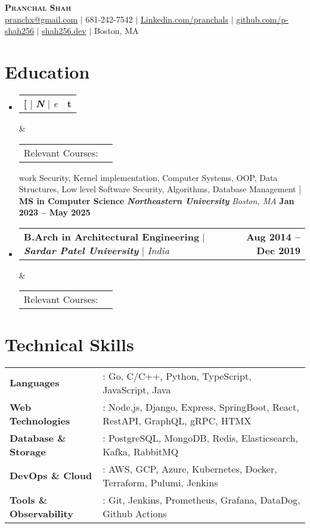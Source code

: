 \documentclass[letterpaper,11pt]{article}
\makeatletter
\newcommand{\preSecSpace}{-10pt}
\newcommand{\postItemSpace}{-10pt}
\newcommand{\preItemSpace}{-10pt}
\newcommand{\preSecVSpace}{\vspace{\preSecSpace}}
\newcommand{\postItemVSpace}{\vspace{\postItemSpace}}
\newcommand{\eduItem}[5][]{
    \item
    \begin{tabular*}{\textwidth}
        {p{5.7in}@{\extracolsep{\fill}}r}
        \textbf{#2} $|$ \textbf{\textit{#3}} $|$ \textit{#4} & \textbf{#5} \\
    \end{tabular*}
        \ifx#1&%
        \else
            \begin{tabular*}{\textwidth}
                {l@{}p{4.5in}}
                \small{Relevant Courses: } & {\small #1} \\
            \end{tabular*}
        \fi
    \postItemVSpace
}
\newcommand{\sectionStart}{
    \begin{itemize}[
        leftmargin=0pt,
        label={},
        topsep=\preItemSpace,    %
        itemsep=2pt,   %
    ]
}
\newcommand{\sectionEnd}{
    \end{itemize}
}
\makeatother
\begin{document}
\begin{center}
    \textbf{\Huge \scshape Pranchal Shah} \\
    \vspace{1pt}
    \href{mailto:pranchx@gmail.com}{\small\underline{pranchx@gmail.com}} $|$
    \small 681-242-7542 $|$
    \href{https://linkedin.com/in/pranchals}{\underline{Linkedin.com/pranchals}} $|$
    \href{https://github.com/p-shah256}{\underline{github.com/p-shah256}} $|$
    \href{https://shah256.dev}{\underline{shah256.dev}} $|$
    \small Boston, MA
    \vspace{1pt}
\end{center}

\section{Education}
\sectionStart
    \eduItem
        [Network Security, Kernel implementation, Computer Systems, OOP, Data Structures, Low level Software Security, Algorithms, Database Management ]
        {\textbf {MS in Computer Science}}
        {\textbf{\textit{Northeastern University}}}
        {\textit{Boston, MA}}
        {\textbf{Jan 2023 -- May 2025}}
    \eduItem
        {\textbf{B.Arch in Architectural Engineering}}
        {\textbf{\textit{Sardar Patel University}}}
        {\textit{India}}
        {\textbf{Aug 2014 -- Dec 2019}}
\sectionEnd

\section{Technical Skills}
\begin{tabular*}{\textwidth}{l@{\hspace{10pt}}l}
    \textbf{\small Languages} & \small : Go, C/C++, Python, TypeScript, JavaScript, Java \\
    \textbf{\small Web Technologies} & \small : Node.js, Django, Express, SpringBoot, React, RestAPI, GraphQL, gRPC, HTMX \\
    \textbf{\small Database \& Storage} & \small : PostgreSQL, MongoDB, Redis, Elasticsearch, Kafka, RabbitMQ \\
    \textbf{\small DevOps \& Cloud} & \small : AWS, GCP, Azure, Kubernetes, Docker, Terraform, Pulumi, Jenkins \\
    \textbf{\small Tools \& Observability} & \small : Git, Jenkins, Prometheus, Grafana, DataDog, Github Actions \\
\end{tabular*}
\end{document}
